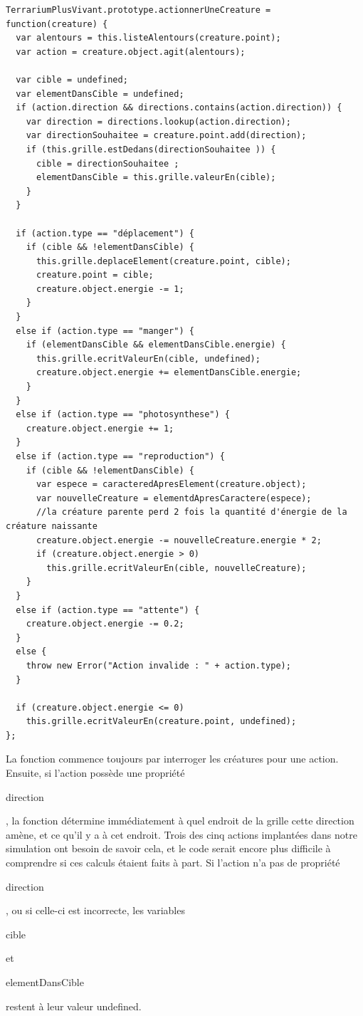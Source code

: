 \documentclass{FramateX}
\renewcommand{\texttt}[1]{\begin{sffamily}{#1}\end{sffamily}}
\begin{document}
\begin{lstlisting}
TerrariumPlusVivant.prototype.actionnerUneCreature = function(creature) {
  var alentours = this.listeAlentours(creature.point);
  var action = creature.object.agit(alentours);

  var cible = undefined;
  var elementDansCible = undefined;
  if (action.direction && directions.contains(action.direction)) {
    var direction = directions.lookup(action.direction);
    var directionSouhaitee = creature.point.add(direction);
    if (this.grille.estDedans(directionSouhaitee )) {
      cible = directionSouhaitee ;
      elementDansCible = this.grille.valeurEn(cible);
    }
  }

  if (action.type == "déplacement") {
    if (cible && !elementDansCible) {
      this.grille.deplaceElement(creature.point, cible);
      creature.point = cible;
      creature.object.energie -= 1;
    }
  }
  else if (action.type == "manger") {
    if (elementDansCible && elementDansCible.energie) {
      this.grille.ecritValeurEn(cible, undefined);
      creature.object.energie += elementDansCible.energie;
    }
  }
  else if (action.type == "photosynthese") {
    creature.object.energie += 1;
  }
  else if (action.type == "reproduction") {
    if (cible && !elementDansCible) {
      var espece = caracteredApresElement(creature.object);
      var nouvelleCreature = elementdApresCaractere(espece);
      //la créature parente perd 2 fois la quantité d'énergie de la créature naissante
      creature.object.energie -= nouvelleCreature.energie * 2;
      if (creature.object.energie > 0)
        this.grille.ecritValeurEn(cible, nouvelleCreature);
    }
  }
  else if (action.type == "attente") {
    creature.object.energie -= 0.2;
  }
  else {
    throw new Error("Action invalide : " + action.type);
  }

  if (creature.object.energie <= 0)
    this.grille.ecritValeurEn(creature.point, undefined);
};
\end{lstlisting}
La fonction commence toujours par interroger les créatures pour une
action. Ensuite, si l'action possède une propriété \texttt{direction},
la fonction détermine immédiatement à quel endroit de la grille cette
direction amène, et ce qu'il y a à cet endroit. Trois des cinq actions
implantées dans notre simulation ont besoin de savoir cela, et le code
serait encore plus difficile à comprendre si ces calculs étaient faits à
part. Si l'action n'a pas de propriété \texttt{direction}, ou si
celle-ci est incorrecte, les variables \texttt{cible} et
\texttt{elementDansCible} restent à leur valeur undefined.
\end{document}
